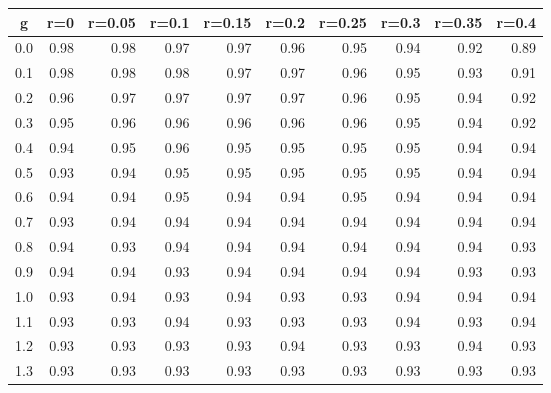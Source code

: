 %
\begin{table}[!tbp]
 \begin{center}
 \begin{tabular}{rrrrrrrrrr}\hline\hline
\multicolumn{1}{c}{g}&\multicolumn{1}{c}{r=0}&\multicolumn{1}{c}{r=0.05}&\multicolumn{1}{c}{r=0.1}&\multicolumn{1}{c}{r=0.15}&\multicolumn{1}{c}{r=0.2}&\multicolumn{1}{c}{r=0.25}&\multicolumn{1}{c}{r=0.3}&\multicolumn{1}{c}{r=0.35}&\multicolumn{1}{c}{r=0.4}\tabularnewline
\hline
0.0&0.98&0.98&0.97&0.97&0.96&0.95&0.94&0.92&0.89\tabularnewline
0.1&0.98&0.98&0.98&0.97&0.97&0.96&0.95&0.93&0.91\tabularnewline
0.2&0.96&0.97&0.97&0.97&0.97&0.96&0.95&0.94&0.92\tabularnewline
0.3&0.95&0.96&0.96&0.96&0.96&0.96&0.95&0.94&0.92\tabularnewline
0.4&0.94&0.95&0.96&0.95&0.95&0.95&0.95&0.94&0.94\tabularnewline
0.5&0.93&0.94&0.95&0.95&0.95&0.95&0.95&0.94&0.94\tabularnewline
0.6&0.94&0.94&0.95&0.94&0.94&0.95&0.94&0.94&0.94\tabularnewline
0.7&0.93&0.94&0.94&0.94&0.94&0.94&0.94&0.94&0.94\tabularnewline
0.8&0.94&0.93&0.94&0.94&0.94&0.94&0.94&0.94&0.93\tabularnewline
0.9&0.94&0.94&0.93&0.94&0.94&0.94&0.94&0.93&0.93\tabularnewline
1.0&0.93&0.94&0.93&0.94&0.93&0.93&0.94&0.94&0.94\tabularnewline
1.1&0.93&0.93&0.94&0.93&0.93&0.93&0.94&0.93&0.94\tabularnewline
1.2&0.93&0.93&0.93&0.93&0.94&0.93&0.93&0.94&0.93\tabularnewline
1.3&0.93&0.93&0.93&0.93&0.93&0.93&0.93&0.93&0.93\tabularnewline
\hline
\end{tabular}

\end{center}

\end{table}

